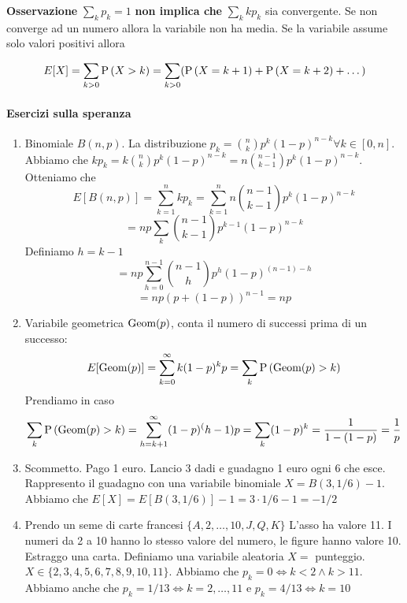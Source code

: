 \textbf{Osservazione} $\sum_{k} p_k = 1 $ \textbf{non implica che} $ \sum_{k} k p_k $ sia convergente. Se non converge ad un numero allora la variabile non ha media. Se la variabile assume solo valori positivi allora

\[  E[X] = \sum_{k>0} \text{P}\left(X > k\right) = \sum_{k>0} (\text{P}\left(X = k+1\right) + \text{P}\left(X = k+2\right) + \dots) \]

\paragraph{Esercizi sulla speranza}

\begin{enumerate}
	\item Binomiale $ B(n,p) $. La distribuzione $ p_k = \binom{n}{k}p^k(1-p)^{n-k}  \forall k \in [0,n] $. Abbiamo che $ kp_k = k \binom{n}{k}p^k (1-p)^{n-k} = n \binom{n-1}{k-1} p^k(1-p)^{n-k} $. Otteniamo che 
		\[ E[B(n,p)] = \sum_{k=1}^{n} kp_k = \sum_{k=1}^{n} n \binom{n-1}{k-1} p^k(1-p)^{n-k} \]
		\[ = np \sum_{k} \binom{n-1}{k-1}p^{k-1}(1-p)^{n-k} \]
		Definiamo $ h = k-1 $
		\[=  np \sum_{h=0}^{n-1} \binom{n-1}{h} p^h(1-p)^{(n-1) - h } \]
		\[ = np(p+(1-p))^{n-1} = np \]
	\item Variabile geometrica $ \text{Geom}(p) $, conta il numero di successi prima di un successo:
		\[ E[\text{Geom}(p)] = \sum_{k=0}^{\infty} k(1-p)^k p = \sum_{k}\text{P}\left(\text{Geom}(p) > k\right) \]
		Prendiamo in caso \[ \sum_{k}\text{P}\left(\text{Geom}(p) > k\right) = \sum_{h=k+1}^{\infty} (1-p)^(h-1)p = \sum_{k}(1-p)^k = \dfrac{1}{1-(1-p)} = \dfrac{1}{p}\]
		
	\item Scommetto. Pago 1 euro. Lancio 3 dadi e guadagno 1 euro ogni 6 che esce.
	Rappresento il guadagno con una variabile binomiale $ X = B(3,1/6) - 1$. Abbiamo che $ E[X] = E[B(3,1/6)] - 1 = 3 \cdot 1/6 - 1 = -1/2$
	
	\item Prendo un seme di carte francesi $ \{ A, 2, \dots, 10, J, Q, K \} $
	L'asso ha valore 11. I numeri da 2 a 10 hanno lo stesso valore del numero, le figure hanno valore 10. Estraggo una carta. Definiamo una variabile aleatoria $ X = $ punteggio. $ X \in \{2,3,4,5,6,7,8,9,10,11\} $. Abbiamo che $ p_k = 0 \iff k< 2 \land k > 11 $. Abbiamo anche che $ p_k = 1/13 \iff k=2,\dots,11$ e $ p_k = 4/13 \iff k=10$
	  
\end{enumerate}


